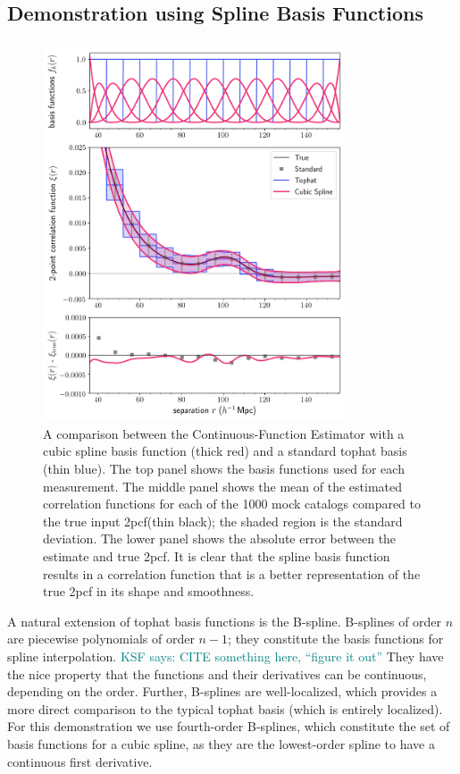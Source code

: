 \documentclass[modern]{aastex62}
\newcommand{\cf}{2pcf\xspace} %
\newcommand{\est}{the Continuous-Function Estimator\xspace}
\newcommand{\KSF}[1]{\textcolor{teal}{KSF says: #1}}
\begin{document}
\subsection{Demonstration using Spline Basis Functions}
\label{sec:spline}

\begin{figure}[ht]

\centering
    \includegraphics[width=0.8\textwidth]{xicomparison_2e-4_tophat8_spline}
    \caption{A comparison between \est with a cubic spline basis function (thick red) and a standard tophat basis (thin blue). The top panel shows the basis functions used for each measurement. The middle panel shows the mean of the estimated correlation functions for each of the 1000 mock catalogs compared to the true input \cf (thin black); the shaded region is the standard deviation. The lower panel shows the absolute error between the estimate and true \cf. It is clear that the spline basis function results in a correlation function that is a better representation of the true \cf in its shape and smoothness.}
    \label{fig:spline}
\end{figure}

A natural extension of tophat basis functions is the B-spline.
B-splines of order $n$ are piecewise polynomials of order $n-1$; they constitute the basis functions for spline interpolation. \KSF{CITE something here, ``figure it out''}
They have the nice property that the functions and their derivatives can be continuous, depending on the order.
Further, B-splines are well-localized, which provides a more direct comparison to the typical tophat basis (which is entirely localized).
For this demonstration we use fourth-order B-splines, which constitute the set of basis functions for a cubic spline, as they are the lowest-order spline to have a continuous first derivative.
\end{document}
